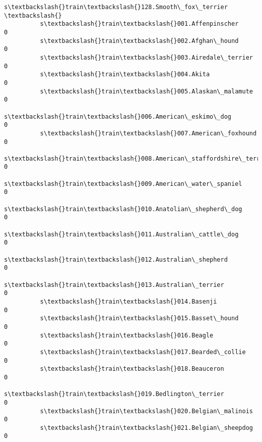 \documentclass[11pt]{article}
\begin{document}
\begin{Verbatim}[commandchars=\\\{\}]
                                                          s\textbackslash{}train\textbackslash{}128.Smooth\_fox\_terrier  \textbackslash{}
          s\textbackslash{}train\textbackslash{}001.Affenpinscher                                                    0   
          s\textbackslash{}train\textbackslash{}002.Afghan\_hound                                                     0   
          s\textbackslash{}train\textbackslash{}003.Airedale\_terrier                                                 0   
          s\textbackslash{}train\textbackslash{}004.Akita                                                            0   
          s\textbackslash{}train\textbackslash{}005.Alaskan\_malamute                                                 0   
          s\textbackslash{}train\textbackslash{}006.American\_eskimo\_dog                                              0   
          s\textbackslash{}train\textbackslash{}007.American\_foxhound                                                0   
          s\textbackslash{}train\textbackslash{}008.American\_staffordshire\_terrier                                   0   
          s\textbackslash{}train\textbackslash{}009.American\_water\_spaniel                                           0   
          s\textbackslash{}train\textbackslash{}010.Anatolian\_shepherd\_dog                                           0   
          s\textbackslash{}train\textbackslash{}011.Australian\_cattle\_dog                                            0   
          s\textbackslash{}train\textbackslash{}012.Australian\_shepherd                                              0   
          s\textbackslash{}train\textbackslash{}013.Australian\_terrier                                               0   
          s\textbackslash{}train\textbackslash{}014.Basenji                                                          0   
          s\textbackslash{}train\textbackslash{}015.Basset\_hound                                                     0   
          s\textbackslash{}train\textbackslash{}016.Beagle                                                           0   
          s\textbackslash{}train\textbackslash{}017.Bearded\_collie                                                   0   
          s\textbackslash{}train\textbackslash{}018.Beauceron                                                        0   
          s\textbackslash{}train\textbackslash{}019.Bedlington\_terrier                                               0   
          s\textbackslash{}train\textbackslash{}020.Belgian\_malinois                                                 0   
          s\textbackslash{}train\textbackslash{}021.Belgian\_sheepdog                                                 0   

\end{Verbatim}
\end{document}
